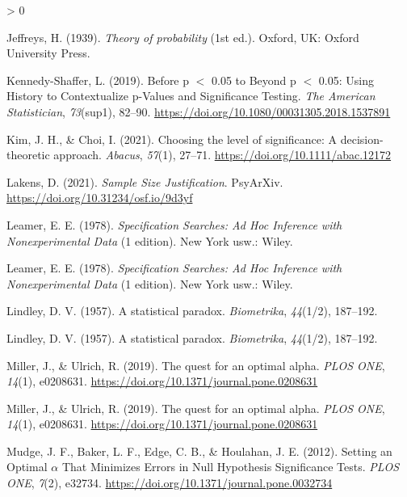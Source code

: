 \documentclass[
  english,
  ,jou, a4paper,floatsintext]{apa6}
\newlength{\cslhangindent}
\newenvironment{CSLReferences}[2] %
 {%
  \setlength{\parindent}{0pt}
  \ifodd #1 \everypar{\setlength{\hangindent}{\cslhangindent}}\ignorespaces\fi
  \ifnum #2 > 0
  \setlength{\parskip}{#2\baselineskip}
  \fi
 }%
 {}
\begin{document}
\begin{CSLReferences}{1}{0}
\leavevmode\hypertarget{ref-Jeffreys1939}{}%
Jeffreys, H. (1939). \emph{Theory of probability} (1st ed.). Oxford, UK: Oxford University Press.

\leavevmode\hypertarget{ref-kennedy-shaffer_before_2019}{}%
Kennedy-Shaffer, L. (2019). Before p {\(<\)} 0.05 to {Beyond} p {\(<\)} 0.05: {Using History} to {Contextualize} p-{Values} and {Significance Testing}. \emph{The American Statistician}, \emph{73}(sup1), 82--90. \url{https://doi.org/10.1080/00031305.2018.1537891}

\leavevmode\hypertarget{ref-kim2021choosing}{}%
Kim, J. H., \& Choi, I. (2021). Choosing the level of significance: A decision-theoretic approach. \emph{Abacus}, \emph{57}(1), 27--71. \url{https://doi.org/10.1111/abac.12172}

\leavevmode\hypertarget{ref-lakens_sample_2021}{}%
Lakens, D. (2021). \emph{Sample {Size} {Justification}}. PsyArXiv. \url{https://doi.org/10.31234/osf.io/9d3yf}

\leavevmode\hypertarget{ref-leamer_specification_1978}{}%
Leamer, E. E. (1978). \emph{Specification {Searches}: {Ad Hoc Inference} with {Nonexperimental Data}} (1 edition). {New York usw.}: {Wiley}.

\leavevmode\hypertarget{ref-leamer_specification_1978}{}%
Leamer, E. E. (1978). \emph{Specification {Searches}: {Ad Hoc Inference} with {Nonexperimental Data}} (1 edition). {New York usw.}: {Wiley}.

\leavevmode\hypertarget{ref-lindley_statistical_1957}{}%
Lindley, D. V. (1957). A statistical paradox. \emph{Biometrika}, \emph{44}(1/2), 187--192.

\leavevmode\hypertarget{ref-lindley_statistical_1957}{}%
Lindley, D. V. (1957). A statistical paradox. \emph{Biometrika}, \emph{44}(1/2), 187--192.

\leavevmode\hypertarget{ref-miller_quest_2019}{}%
Miller, J., \& Ulrich, R. (2019). The quest for an optimal alpha. \emph{PLOS ONE}, \emph{14}(1), e0208631. \url{https://doi.org/10.1371/journal.pone.0208631}

\leavevmode\hypertarget{ref-miller_quest_2019}{}%
Miller, J., \& Ulrich, R. (2019). The quest for an optimal alpha. \emph{PLOS ONE}, \emph{14}(1), e0208631. \url{https://doi.org/10.1371/journal.pone.0208631}

\leavevmode\hypertarget{ref-mudge_setting_2012}{}%
Mudge, J. F., Baker, L. F., Edge, C. B., \& Houlahan, J. E. (2012). Setting an {Optimal} {\(\alpha\)} {That Minimizes Errors} in {Null Hypothesis Significance Tests}. \emph{PLOS ONE}, \emph{7}(2), e32734. \url{https://doi.org/10.1371/journal.pone.0032734}


\end{CSLReferences}
\end{document}
